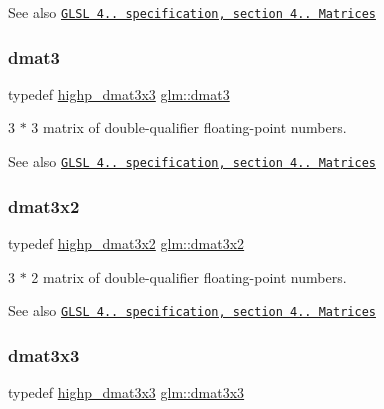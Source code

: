 \begin{DoxySeeAlso}{See also}
\href{http://www.opengl.org/registry/doc/GLSLangSpec.4.20.8.pdf}{\tt G\+L\+SL 4.. specification, section 4.. Matrices} 
\end{DoxySeeAlso}
\mbox{\label{group__core__types_ga25fd62195c3ef5ac0d32ead1dbfbb929}} 
\subsubsection{\texorpdfstring{dmat3}{dmat3}}
{\footnotesize\ttfamily typedef \hyperlink{group__core__precision_gae5f677e4437523476511c84a17206ac2}{highp\+\_\+dmat3x3} \hyperlink{group__core__types_ga25fd62195c3ef5ac0d32ead1dbfbb929}{glm\+::dmat3}}

3 $\ast$ 3 matrix of double-\/qualifier floating-\/point numbers.

\begin{DoxySeeAlso}{See also}
\href{http://www.opengl.org/registry/doc/GLSLangSpec.4.20.8.pdf}{\tt G\+L\+SL 4.. specification, section 4.. Matrices} 
\end{DoxySeeAlso}
\mbox{\label{group__core__types_ga2db259d2e7921065c5b7d4dca9547960}} 
\subsubsection{\texorpdfstring{dmat3x2}{dmat3x2}}
{\footnotesize\ttfamily typedef \hyperlink{group__core__precision_ga8454b92a3917b17a8663f2409cb3100d}{highp\+\_\+dmat3x2} \hyperlink{group__core__types_ga2db259d2e7921065c5b7d4dca9547960}{glm\+::dmat3x2}}

3 $\ast$ 2 matrix of double-\/qualifier floating-\/point numbers.

\begin{DoxySeeAlso}{See also}
\href{http://www.opengl.org/registry/doc/GLSLangSpec.4.20.8.pdf}{\tt G\+L\+SL 4.. specification, section 4.. Matrices} 
\end{DoxySeeAlso}
\mbox{\label{group__core__types_gaf3c29c4f75a448f308463e75ca2efd4c}} 
\subsubsection{\texorpdfstring{dmat3x3}{dmat3x3}}
{\footnotesize\ttfamily typedef \hyperlink{group__core__precision_gae5f677e4437523476511c84a17206ac2}{highp\+\_\+dmat3x3} \hyperlink{group__core__types_gaf3c29c4f75a448f308463e75ca2efd4c}{glm\+::dmat3x3}}

